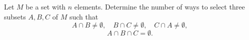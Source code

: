 Let $M$ be a set with $n$ elements. Determine the number of ways to select three
subsets $A,B,C$ of $M$ such that
$$A \cap B \neq \emptyset, \quad B \cap C \neq \emptyset, \quad C \cap A \neq \emptyset,$$
$$A \cap B \cap C = \emptyset.$$